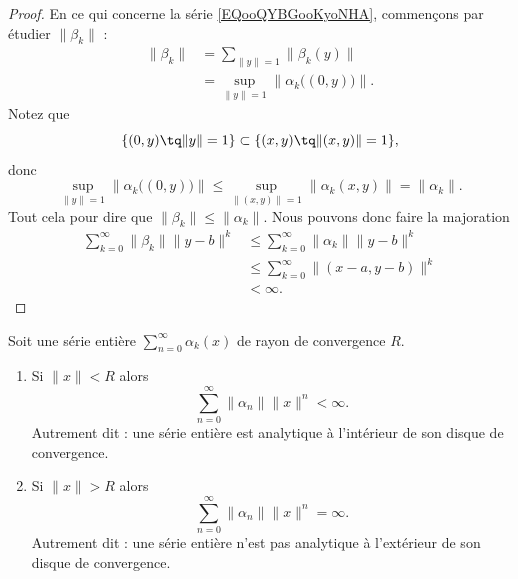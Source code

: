 \begin{proof}
	En ce qui concerne la série \eqref{EQooQYBGooKyoNHA}, commençons par étudier \( \| \beta_k \|\) :
	\begin{subequations}
		\begin{align}
			\| \beta_k \| & =\sum_{\| y \|=1}\| \beta_k(y) \|                 \\
			              & =\sup_{\| y \|=1}\| \alpha_k\big( (0,y) \big) \|.
		\end{align}
	\end{subequations}
	Notez que
	\begin{equation}
		\{ (0,y)\tq \| y \|=1 \}\subset\{ (x,y)\tq  \| (x,y) \|=1 \},
	\end{equation}
	donc
	\begin{equation}
		\sup_{\| y \|=1}\| \alpha_k\big( (0,y) \big)  \|\leq \sup_{\| (x,y) \|=1}\| \alpha_k(x,y) \|=\| \alpha_k \|.
	\end{equation}
	Tout cela pour dire que \( \| \beta_k \|\leq \| \alpha_k \|\). Nous pouvons donc faire la majoration
	\begin{subequations}
		\begin{align}
			\sum_{k=0}^{\infty}\| \beta_k \|\| y-b \|^k & \leq \sum_{k=0}^{\infty}\| \alpha_k \|\| y-b \|^k \\
			                                            & \leq\sum_{k=0}^{\infty}\| (x-a,y-b) \|^k          \\
			                                            & <\infty.
		\end{align}
	\end{subequations}
\end{proof}



\begin{proposition}	\label{PROPooHCYXooHlUEuV}
	Soit une série entière \( \sum_{n=0}^{\infty}\alpha_k(x)\) de rayon de convergence \( R\).

	\begin{enumerate}
		\item		\label{ITEMooVAOTooELMOlK}
		      Si \( \| x \|<R\) alors
		      \begin{equation}
			      \sum_{n=0}^{\infty}\| \alpha_n \|\| x \|^n<\infty.
		      \end{equation}
		      Autrement dit : une série entière est analytique à l'intérieur de son disque de convergence.
		\item	\label{ITEMooEEVMooVeiHyY}
		      Si \( \| x \|>R\) alors
		      \begin{equation}
			      \sum_{n=0}^{\infty}\| \alpha_n \|\| x \|^n=\infty.
		      \end{equation}
		      Autrement dit : une série entière n'est pas analytique à l'extérieur de son disque de convergence.
	\end{enumerate}
\end{proposition}

